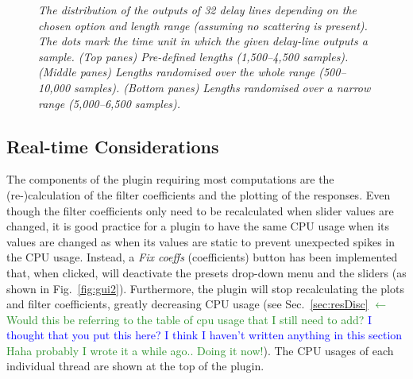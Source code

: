 \documentclass[twoside,a4paper]{article}
\newcommand{\silvin}[1]{\textcolor{ForestGreen}{#1}}
\newcommand{\karolina}[1]{\textcolor{blue}{#1}}
\begin{document}
\begin{figure}[t!]
    \caption{\textit{The distribution of the outputs of 32 delay lines depending on the chosen option and length range (assuming no scattering is present). The dots mark the time unit in which the given delay-line outputs a sample. (Top panes) Pre-defined lengths (1,500--4,500 samples). (Middle panes) Lengths randomised over the whole range (500--10,000 samples). (Bottom panes) Lengths randomised over a narrow range (5,000--6,500 samples). }}
    \label{fig:dLens}
\end{figure}

\subsection{Real-time Considerations}
The components of the plugin requiring most computations are the (re-)calculation of the filter coefficients and the plotting of the responses. Even though the filter coefficients only need to be recalculated when slider values are changed, it is good practice for a plugin to have the same CPU usage when its values are changed as when its values are static to prevent unexpected spikes in the CPU usage. Instead, a \textit{Fix coeffs} (coefficients) button has been implemented that, when clicked, will deactivate the presets drop-down menu and the sliders (as shown in Fig.~\ref{fig:gui2}). Furthermore, the plugin will stop recalculating the plots and filter coefficients, greatly decreasing CPU usage (see Sec.~\ref{sec:resDisc} \silvin{$\leftarrow$ Would this be referring to the table of cpu usage that I still need to add?} \karolina{I thought that you put this here? I think I haven't written anything in this section} \silvin{Haha probably I wrote it a while ago.. Doing it now!}). The CPU usages of each individual thread are shown at the top of the plugin.
\end{document}
